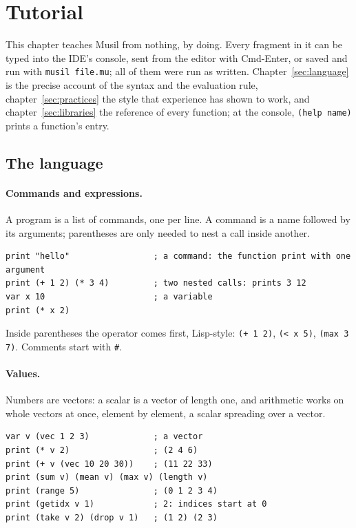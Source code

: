 \documentclass[11pt,a4paper]{article}
\newcommand{\musil}[1]{\lstinline[style=musilinline]{#1}}
\begin{document}
\section{Tutorial}
\label{sec:tutorial}

This chapter teaches Musil from nothing, by doing. Every fragment in it can be typed into
the IDE's console, sent from the editor with Cmd-Enter, or saved and run with
\texttt{musil file.mu}; all of them were run as written. Chapter~\ref{sec:language} is the
precise account of the syntax and the evaluation rule, chapter~\ref{sec:practices} the
style that experience has shown to work, and chapter~\ref{sec:libraries} the reference of
every function; at the console, \musil{(help name)} prints a function's entry.

\subsection{The language}

\paragraph{Commands and expressions.} A program is a list of commands, one per line. A
command is a name followed by its arguments; parentheses are only needed to nest a call
inside another.

\begin{lstlisting}
print "hello"                 ; a command: the function print with one argument
print (+ 1 2) (* 3 4)         ; two nested calls: prints 3 12
var x 10                      ; a variable
print (* x 2)
\end{lstlisting}

Inside parentheses the operator comes first, Lisp-style: \musil{(+ 1 2)}, \musil{(< x 5)},
\musil{(max 3 7)}. Comments start with \texttt{\#}.

\paragraph{Values.} Numbers are vectors: a scalar is a vector of length one, and arithmetic
works on whole vectors at once, element by element, a scalar spreading over a vector.

\begin{lstlisting}
var v (vec 1 2 3)             ; a vector
print (* v 2)                 ; (2 4 6)
print (+ v (vec 10 20 30))    ; (11 22 33)
print (sum v) (mean v) (max v) (length v)
print (range 5)               ; (0 1 2 3 4)
print (getidx v 1)            ; 2: indices start at 0
print (take v 2) (drop v 1)   ; (1 2) (2 3)
\end{lstlisting}
\end{document}
